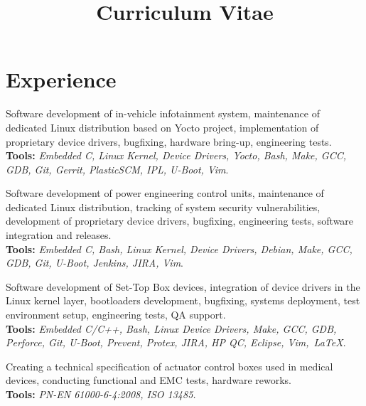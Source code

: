 \documentclass[11pt,a4paper,sans]{moderncv} %
\title{Curriculum Vitae}
\begin{document}
\makecvtitle %


\section{Experience}

{Software development of in-vehicle infotainment system, maintenance of dedicated Linux distribution
based on Yocto project, implementation of proprietary device drivers, bugfixing, hardware bring-up,
engineering tests.\\ \textbf{Tools:} \textit{Embedded C, Linux Kernel, Device Drivers, Yocto, Bash,
Make, GCC, GDB, Git, Gerrit, PlasticSCM, IPL, U-Boot, Vim}.}


{Software development of power engineering control units, maintenance of dedicated Linux distribution,
tracking of system security vulnerabilities, development of proprietary device drivers, bugfixing,
engineering tests, software integration and releases. \\ \textbf{Tools:} \textit{Embedded C, Bash,
Linux Kernel, Device Drivers, Debian, Make, GCC, GDB, Git, U-Boot, Jenkins, JIRA, Vim}.}


{Software development of Set-Top Box devices, integration of device drivers in the Linux kernel layer,
bootloaders development, bugfixing, systems deployment, test environment setup, engineering tests,
QA support. \\ \textbf{Tools:} \textit{Embedded C/C++, Bash, Linux Device Drivers, Make, GCC, GDB,
Perforce, Git, U-Boot, Prevent, Protex, JIRA, HP QC, Eclipse, Vim,~\LaTeX}.}

{Creating a technical specification of actuator control boxes used in medical devices, conducting functional
and EMC tests, hardware reworks. \\ \textbf{Tools:} \textit{PN-EN 61000-6-4:2008, ISO 13485.}}
\end{document}
